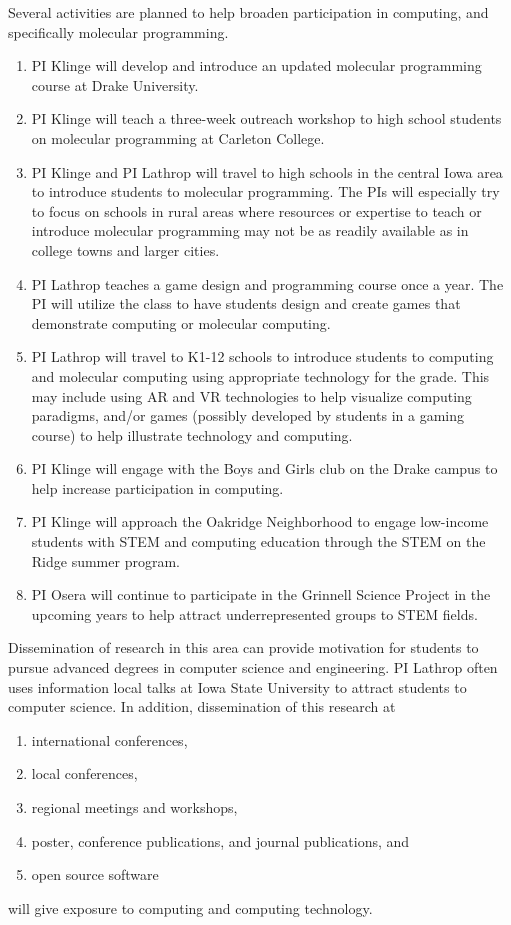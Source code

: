 Several activities are planned to help broaden participation in computing, and specifically molecular programming.
\begin{enumerate}

    \item PI Klinge will develop and introduce an updated molecular programming course at Drake University.
    \item PI Klinge will teach a three-week outreach workshop to high school students on molecular programming at Carleton College.
    \item PI Klinge and PI Lathrop will travel to high schools in the central Iowa area to introduce students to molecular programming.  The PIs will especially try to focus on schools in rural areas where resources or expertise to teach or introduce molecular programming may not be as readily available as in college towns and larger cities.
    \item PI Lathrop teaches a game design and programming course once a year.  The PI will utilize the class to have students design and create games that demonstrate computing or molecular computing.
    \item PI Lathrop will travel to K1-12 schools to introduce students to computing and molecular computing using appropriate technology for the grade.  This may include using AR and VR technologies to help visualize computing paradigms, and/or games (possibly developed by students in a gaming course) to help illustrate technology and computing.
    \item PI Klinge will engage with the Boys and Girls club on the Drake campus to help increase participation in computing.
    \item PI Klinge will approach the Oakridge Neighborhood to engage low-income students with STEM and computing education through the STEM on the Ridge summer program.
  \item PI Osera will continue to participate in the Grinnell Science Project in the upcoming years to help attract underrepresented groups to STEM fields.
\end{enumerate}

Dissemination of research in this area can provide motivation for students to pursue advanced degrees in computer science and engineering.  PI Lathrop often uses information local talks at Iowa State University to attract students to computer science.  In addition, dissemination of this research at
\begin{enumerate}
    \item international conferences,
    \item local conferences,
    \item regional meetings and workshops,
    \item poster, conference publications, and journal publications, and
    \item open source software
\end{enumerate}
will give exposure to computing and computing technology.

